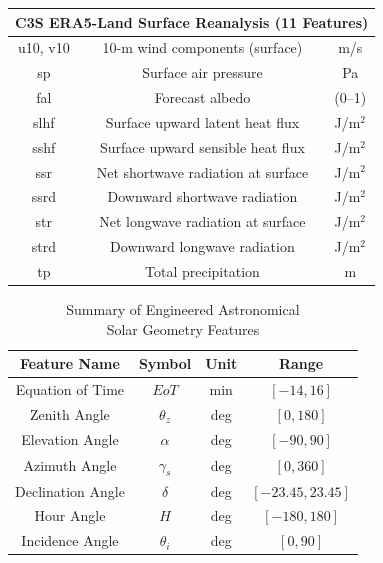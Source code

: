 \documentclass[conference]{IEEEtran}
\begin{document}
\begin{table}[!hb]
\begin{tabular}{|c|c|c|}
			\multicolumn{3}{|c|}{\textbf{C3S ERA5-Land Surface Reanalysis (11 Features)}} \\ \hline
			u10, v10  & 10-m wind components (surface)                       & m/s \\ \hline
			sp        & Surface air pressure                                 & Pa \\ \hline
			fal       & Forecast albedo                                      & (0--1) \\ \hline
			slhf      & Surface upward latent heat flux             & J/m$^{2}$ \\ \hline
			sshf      & Surface upward sensible heat flux           & J/m$^{2}$ \\ \hline
			ssr       & Net shortwave radiation at surface          & J/m$^{2}$ \\ \hline
			ssrd      & Downward shortwave radiation                & J/m$^{2}$ \\ \hline
			str       & Net longwave radiation at surface           & J/m$^{2}$ \\ \hline
			strd      & Downward longwave radiation                 & J/m$^{2}$ \\ \hline
			tp        & Total precipitation                         & m \\ \hline
		\end{tabular}
	\end{table}
	
	\begin{table}[!hb]
		\centering
		\caption{Summary of Engineered Astronomical\\ Solar Geometry Features}
		\label{tab:solar_features}
		\setlength{\tabcolsep}{5pt}
		\footnotesize
		\begin{tabular}{|c|c|c|c|}
			\hline
			\textbf{Feature Name} & \textbf{Symbol} & \textbf{Unit} & \textbf{Range} \\ \hline
			Equation of Time      & $EoT$           & min           & $[-14, 16]$ \\ \hline
			Zenith Angle          & $\theta_z$      & deg           & $[0, 180]$ \\ \hline
			Elevation Angle       & $\alpha$        & deg           & $[-90, 90]$ \\ \hline
			Azimuth Angle         & $\gamma_s$      & deg           & $[0, 360]$ \\ \hline
			Declination Angle     & $\delta$        & deg           & $[-23.45, 23.45]$ \\ \hline
			Hour Angle            & $H$             & deg           & $[-180, 180]$ \\ \hline
			Incidence Angle       & $\theta_i$      & deg           & $[0, 90]$ \\ \hline
		\end{tabular}
	\end{table}
	
\end{document}
